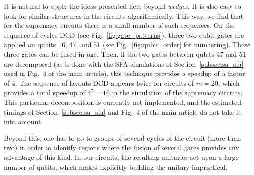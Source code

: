 It is natural to apply the ideas presented here beyond \emph{wedges}. It is also easy to look for similar structures in the circuits algorithmically. This way, we find that for the supremacy circuits there is a small number of such sequences. On the sequence of cycles DCD (see Fig.~\ref{fig:gate_patterns}), three two-qubit gates are applied on qubits 16, 47, and 51 (see Fig.~\ref{fig:qubit_order} for numbering). These three gates can be fused in one. Then, if the two gates between qubits 47 and 51 are decomposed (as is done with the SFA simulations of Section~\ref{subsec:sa_sfa} used in Fig.~4 of the main article), this technique provides a speedup of a factor of 4. The sequence of layouts DCD appears twice for circuits of $m=20$, which provides a total speedup of $4^2=16$ in the simulation of the supremacy circuits. This particular decomposition is currently not implemented, and the estimated timings of Section~\ref{subsec:sa_sfa} and Fig.~4 of the main article do not take it into account.

Beyond this, one has to go to groups of several cycles of the circuit (more than two) in order to identify regions where the fusion of several gates provides any advantage of this kind. In our circuits, the resulting unitaries act upon a large number of qubits, which makes explicitly building the unitary impractical.\



